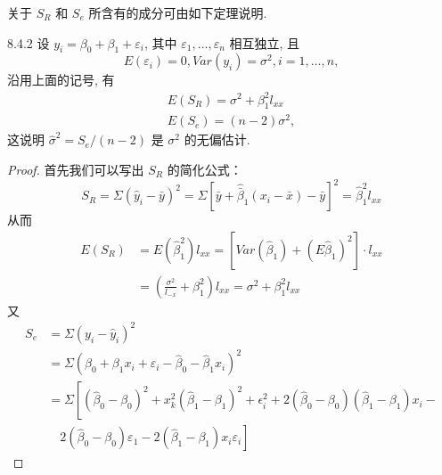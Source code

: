 关于 $S_R$ 和 $S_e$ 所含有的成分可由如下定理说明.
\begin{theorem}{}{8.4.2}
    设  $y_i = \beta_0 + \beta_1 + \varepsilon_i$, 其中  $\varepsilon_1, \ldots, \varepsilon_n$ 相互独立, 且
    \begin{equation*}
    E(\varepsilon_i) = 0, Var(y_i) = \sigma^2, i = 1, \ldots, n,
    \end{equation*}
    沿用上面的记号, 有
    \begin{align}
    E(S_R) = \sigma^2 + \beta_{1}^{2} l_{xx}\\
    E(S_e) = (n-2) \sigma^2,
    \end{align}
    这说明 $\hat{\sigma}^2 = S_{e}/(n-2)$ 是 $\sigma^2$ 的无偏估计.
\end{theorem}
\begin{proof}
    首先我们可以写出 $S_R$ 的简化公式：
    \begin{equation}
    S_{R}=\Sigma\left(\hat{y}_{i}-\bar{y}\right)^{2}=\Sigma\left[\bar{y}+\hat{\bar{\beta}}_{1}\left(x_{i}-\bar{x}\right)-\bar{y}\right]^{2}=\hat{\beta}_{1}^{2} l_{x x}
    \end{equation}\label{eq:8.4.16}
    从而
    \begin{equation*}
    \begin{aligned} 
    E\left(S_{R}\right) &=E\left(\hat{\beta}_{1}^{2}\right) l_{x x}=\left[Var\left(\hat{\beta}_{1}\right)+\left(E \hat{\beta}_{1}\right)^{2}\right] \cdot l_{x x} \\ 
    &=\left(\frac{\sigma^{2}}{l_{-x}}+\beta_{1}^{2}\right) l_{x x}=\sigma^{2}+\beta_{1}^{2} l_{x x} 
    \end{aligned}
    \end{equation*}
    又
    \begin{equation}
    \begin{aligned} 
    S_{e} 
    & =\Sigma\left(y_{i}-\hat{y}_{i}\right)^{2} \\ 
    & =\Sigma\left(\beta_{0}+\beta_{1} x_{i}+\varepsilon_{i}-\hat{\beta}_{0}-\hat{\beta}_{1} x_{i}\right)^{2}\\ 
    & =\Sigma\left[\left(\hat{\beta}_{0}-\beta_{0}\right)^{2}+x_{k}^{2}\left(\hat{\beta}_{1}-\beta_{1}\right)^{2}+\epsilon_{i}^{2}+  2(\hat{\beta}_{0}-\beta_{0})\left(\hat{\beta}_{1}-\beta_{1}\right) x_{i}-\right.\\ 
    & \quad \left.2\left(\hat{\beta}_{0}-\beta_{0}\right) \varepsilon_{1}-2\left(\hat{\beta}_{1}-\beta_{1}\right) x_{i} \varepsilon_{i}\right] 
    \end{aligned}
    \end{equation}

\end{proof}
